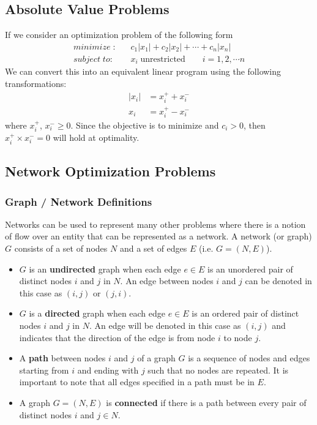 \documentclass[11pt]{article}
\begin{document}
\subsection{Absolute Value Problems}
If we consider an optimization problem of the following form
\begin{align*}
minimize \; : & \; \; \; c_1 |x_1| + c_2 |x_2| + \cdots + c_n |x_n|  \\ 
subject \; to : & \; \; \; x_i \; \text{unrestricted} \quad \quad i = 1,2,\cdots n
\end{align*}
We can convert this into an equivalent linear program using the following transformations:
\begin{align*}
 |x_i| & =x_i^+ + x_i ^ -  \\ 
 x_i & =x_i^+ - x_i ^ -   
\end{align*}
where $x_i^+$, $x_i^- \geq 0$. Since the objective is to minimize and $c_i > 0$, then $x^+_i \times x^-_i = 0$ will hold at optimality.
\subsection{Network Optimization Problems}
\subsubsection{Graph / Network Definitions}
Networks can be used to represent many other problems where there is a notion of flow over an entity that can be represented as a network.  A network (or graph) $G$ consists of a set of nodes $N$ and a set of edges $E$ (i.e. $G = (N, E)$).  
\begin{itemize}
\item $G$ is an \textbf{undirected} graph when each edge $e  \in E$ is an unordered pair of distinct nodes $i$ and $j$ in $N$. An edge between nodes $i$ and $j$ can be denoted in this case as $(i, j)$ or $(j, i)$. 
\item $G$ is a \textbf{directed} graph when each edge $e \in E$ is an ordered pair of distinct nodes $i$ and $j$ in $N$. An edge will be denoted in this case as $(i, j)$ and indicates that the direction of the edge is from node $i$ to node $j$.
\item A \textbf{path} between nodes $i$ and $j$ of a graph $G$ is a sequence of nodes and edges starting from $i$ and ending with $j$ such that no nodes are repeated. It is important to note that all edges specified in a path must be in $E$.
\item A graph $G = (N, E)$ is \textbf{connected} if there is a path between every pair of distinct nodes $i$ and $j \in N$.
\end{itemize}
\end{document}
